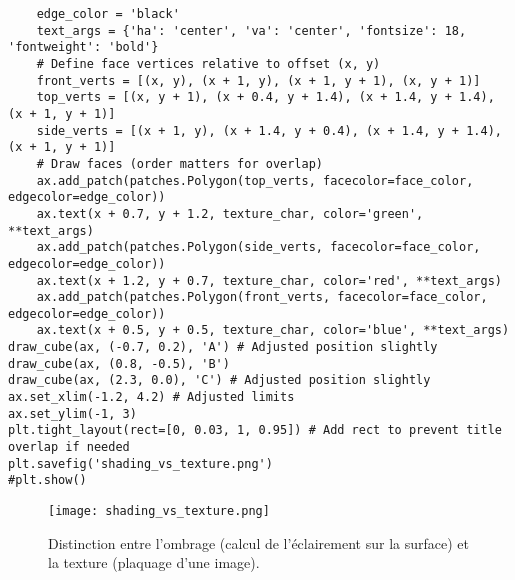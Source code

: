 \begin{verbatim}
    edge_color = 'black'
    text_args = {'ha': 'center', 'va': 'center', 'fontsize': 18, 'fontweight': 'bold'}
    # Define face vertices relative to offset (x, y)
    front_verts = [(x, y), (x + 1, y), (x + 1, y + 1), (x, y + 1)]
    top_verts = [(x, y + 1), (x + 0.4, y + 1.4), (x + 1.4, y + 1.4), (x + 1, y + 1)]
    side_verts = [(x + 1, y), (x + 1.4, y + 0.4), (x + 1.4, y + 1.4), (x + 1, y + 1)]
    # Draw faces (order matters for overlap)
    ax.add_patch(patches.Polygon(top_verts, facecolor=face_color, edgecolor=edge_color))
    ax.text(x + 0.7, y + 1.2, texture_char, color='green', **text_args)
    ax.add_patch(patches.Polygon(side_verts, facecolor=face_color, edgecolor=edge_color))
    ax.text(x + 1.2, y + 0.7, texture_char, color='red', **text_args)
    ax.add_patch(patches.Polygon(front_verts, facecolor=face_color, edgecolor=edge_color))
    ax.text(x + 0.5, y + 0.5, texture_char, color='blue', **text_args)
draw_cube(ax, (-0.7, 0.2), 'A') # Adjusted position slightly
draw_cube(ax, (0.8, -0.5), 'B')
draw_cube(ax, (2.3, 0.0), 'C') # Adjusted position slightly
ax.set_xlim(-1.2, 4.2) # Adjusted limits
ax.set_ylim(-1, 3)
plt.tight_layout(rect=[0, 0.03, 1, 0.95]) # Add rect to prevent title overlap if needed
plt.savefig('shading_vs_texture.png')
#plt.show()
\end{verbatim}
\begin{figure}[H]
\centering
\texttt{[image: shading\_vs\_texture.png]}
\caption{Distinction entre l'ombrage (calcul de l'éclairement sur la surface) et la texture (plaquage d'une image).}
\label{fig:shading_vs_texture}
\end{figure}
